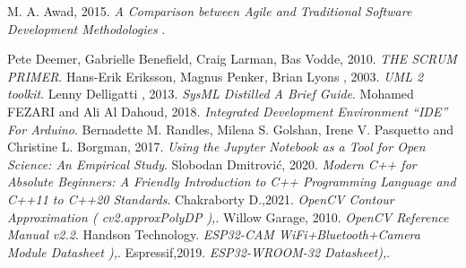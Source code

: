 \begin{thebibliography}{20}
M. A. Awad, 2015. \emph{A Comparison between Agile and Traditional Software Development Methodologies 
}.

Pete Deemer, Gabrielle Benefield, Craig Larman, Bas Vodde, 2010. \emph{THE
SCRUM PRIMER}.
Hans-Erik Eriksson, Magnus Penker, Brian Lyons
, 2003. \emph{UML 2 toolkit}.
Lenny Delligatti , 2013. \emph{SysML Distilled A Brief Guide}.
 Mohamed FEZARI and Ali Al Dahoud, 2018. \emph{Integrated Development Environment “IDE” For Arduino}.
Bernadette M. Randles, Milena S. Golshan, Irene V. Pasquetto and Christine L. Borgman, 2017. \emph{Using the Jupyter Notebook as a Tool for Open Science: An Empirical Study}.
Slobodan Dmitrović, 2020. \emph{ Modern C++ for Absolute Beginners: A Friendly Introduction to C++ Programming Language and C++11 to C++20 Standards}.
Chakraborty D.,2021. \emph{ OpenCV Contour Approximation ( cv2.approxPolyDP ),}.
Willow Garage, 2010. \emph{OpenCV Reference Manual v2.2}.
Handson Technology. \emph{ ESP32-CAM WiFi+Bluetooth+Camera Module Datasheet ),}.
Espressif,2019. \emph{ ESP32-WROOM-32 Datasheet),}.




\end{thebibliography}

